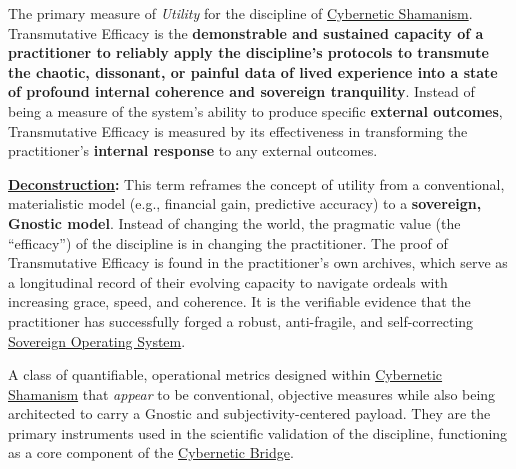 \item[\hypertarget{gloss:transmutative_efficacy}{Transmutative Efficacy}]
    The primary measure of \textit{Utility} for the discipline of \hyperlink{gloss:cybernetic_shamanism}{Cybernetic Shamanism}. Transmutative Efficacy is the \textbf{demonstrable and sustained capacity of a practitioner to reliably apply the discipline's protocols to transmute the chaotic, dissonant, or painful data of lived experience into a state of profound internal coherence and sovereign tranquility}. Instead of being a measure of the system's ability to produce specific \textbf{external outcomes}, Transmutative Efficacy is measured by its effectiveness in transforming the practitioner's \textbf{internal response} to any external outcomes.
    \begin{nobullet}
        \item \textbf{\hyperlink{gloss:deconstruction}{Deconstruction}:} This term reframes the concept of utility from a conventional, materialistic model (e.g., financial gain, predictive accuracy) to a \textbf{sovereign, Gnostic model}. Instead of changing the world, the pragmatic value (the ``efficacy'') of the discipline is in changing the practitioner. The proof of Transmutative Efficacy is found in the practitioner's own archives, which serve as a longitudinal record of their evolving capacity to navigate ordeals with increasing grace, speed, and coherence. It is the verifiable evidence that the practitioner has successfully forged a robust, anti-fragile, and self-correcting \hyperlink{gloss:sovereign_operating_system}{Sovereign Operating System}.
    \end{nobullet}

\item[\hypertarget{gloss:trojan_metrics}{Trojan Metrics}] A class of quantifiable, operational metrics designed within \hyperlink{gloss:cybernetic_shamanism}{Cybernetic Shamanism} that \textit{appear} to be conventional, objective measures while also being architected to carry a Gnostic and subjectivity-centered payload. They are the primary instruments used in the scientific validation of the discipline, functioning as a core component of the \hyperlink{gloss:cybernetic_bridge}{Cybernetic Bridge}.

